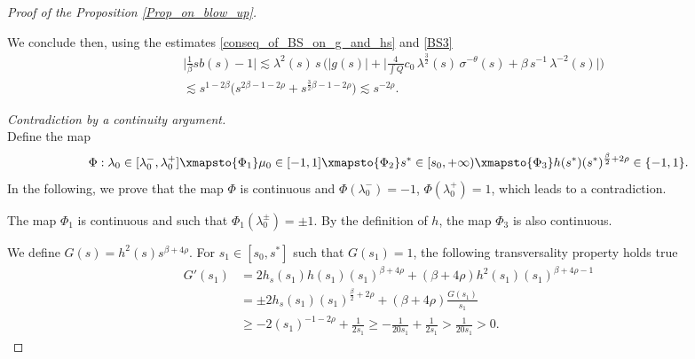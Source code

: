 \documentclass[16pt,english, oneside,reqno]{smfart}
\begin{document}
\begin{proof}[Proof of the Proposition \ref{Prop_on_blow_up}]
\begin{itemize}
We conclude then, using the estimates \eqref{conseq_of_BS_on_g_and_hs} and \eqref{BS3}
\begin{equation}
\begin{split}
    &\Big\lvert \frac{1}{\beta}sb(s)-1 \Big\rvert \lesssim \lambda^2(s)\,s\,\Big(|g(s)| + \Big|\frac{4}{\int Q} c_0\,\lambda^{\frac 32}(s)\,\sigma^{-\theta}(s) + \beta\,s^{-1}\,\lambda^{-2}(s) \Big| \Big)\\ 
    &\lesssim s^{1-2\beta}\Big( s^{2\beta-1-2\rho} + s^{\frac{3}{2}\beta-1-2\rho} \Big) \lesssim s^{-2\rho} .
\end{split}
\end{equation}
\end{itemize}

\vspace{0.2cm}
\textit{Contradiction by a continuity argument.}\\
Define the map
\begin{equation}
    \Phi: \lambda_0 \in [\lambda^-_0,\lambda^+_0] \xmapsto{\Phi_1} \mu_0 \in [-1,1] \xmapsto{\Phi_2} s^*\in [s_0,+\infty)\xmapsto{\Phi_3} h(s^*)(s^*)^{\frac{\beta}{2}+2\rho}\in \{-1,1\}.
\end{equation}
In the following, we prove that the map $\Phi$ is continuous 
and $\Phi(\lambda_0^-)=-1$, $\Phi(\lambda_0^+)=1$, which
leads to a contradiction. 

The map $\Phi_1$ is continuous and such that $\Phi_1(\lambda^{\pm}_0) = \pm1$. By the definition of $h$, the map $\Phi_3$ is also continuous. 


We define $G(s) = h^2(s)s^{\beta+4\rho}$. For $s_1 \in [s_0,s^*]$ such that $G(s_1) = 1$, the following transversality property holds true
\begin{equation}
\begin{split}
    G'(s_1) 
    &= 2h_s(s_1)h(s_1)(s_1)^{\beta + 4\rho} + (\beta + 4\rho)h^2(s_1)(s_1)^{\beta+4\rho-1}\\
    &= \pm 2 h_s(s_1)(s_1)^{\frac{\beta}{2}+2\rho} + (\beta + 4\rho)\frac{G(s_1)}{s_1}\\
    &\geq -2(s_1)^{-1-2\rho}+\frac{1}{2s_1} \geq -\frac{1}{20s_1}+ \frac{1}{2s_1} >\frac{1}{20s_1} >0.
\end{split}
\end{equation}


\end{proof}
\end{document}
